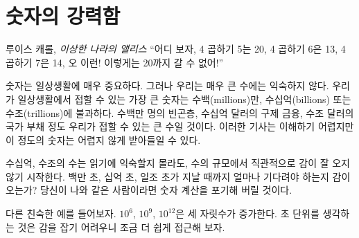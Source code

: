 \chapter{숫자의 강력함}
\label{les:15}

\begin{chapquote}{루이스 캐롤, \textit{이상한 나라의 앨리스}}
	\enquote{어디 보자, 
		4 곱하기 5는 20, 
		4 곱하기 6은 13, 
		4 곱하기 7은 14, 
		오 이런! 이렇게는 20까지 갈 수 없어!}
\end{chapquote}

\begin{comment}
	Numbers are an essential part of our everyday life. Large numbers,
	however, aren't something most of us are too familiar with. The largest
	numbers we might encounter in everyday life are in the range of
	millions, billions, or trillions. We might read about millions of people
	in poverty, billions of dollars spent on bank bailouts, and trillions of
	national debt. Even though it's hard to make sense of these headlines,
	we are somewhat comfortable with the size of those numbers.
\end{comment}
숫자는 일상생활에 매우 중요하다. 
그러나 우리는 매우 큰 수에는 익숙하지 않다.
우리가 일상생활에서 접할 수 있는 가장 큰 숫자는 수백(millions)만, 수십억(billions) 또는 수조(trillions)에 불과하다.
수백만 명의 빈곤층, 수십억 달러의 구제 금융, 수조 달러의 국가 부채 정도 우리가 접할 수 있는 큰 수일 것이다.
이러한 기사는 이해하기 어렵지만 이 정도의 숫자는 어렵지 않게 받아들일 수 있다.

\begin{comment}
	Although we might seem comfortable with billions and trillions, our
	intuition already starts to fail with numbers of this magnitude. Do you
	have an intuition how long you would have to wait for a
	million/billion/trillion seconds to pass? If you are anything like me,
	you are lost without actually crunching the numbers.
\end{comment}
수십억, 수조의 수는 읽기에 익숙할지 몰라도, 수의 규모에서 직관적으로 감이 잘 오지 않기 시작한다.
백만 초, 십억 초, 일조 초가 지날 때까지 얼마나 기다려야 하는지 감이 오는가?
당신이 나와 같은 사람이라면 숫자 계산을 포기해 버릴 것이다.

\begin{comment}
	Let's take a closer look at this example: the difference between each is an
	increase by three orders of magnitude: $10^6$, $10^9$, $10^{12}$. Thinking about
	seconds is not very useful, so let's translate this into something we can wrap
	our head around:
\end{comment}
다른 친숙한 예를 들어보자. $10^6$, $10^9$, $10^{12}$은 세 자릿수가 증가한다. 
초 단위를 생각하는 것은 감을 잡기 어려우니 조금 더 쉽게 접근해 보자.

